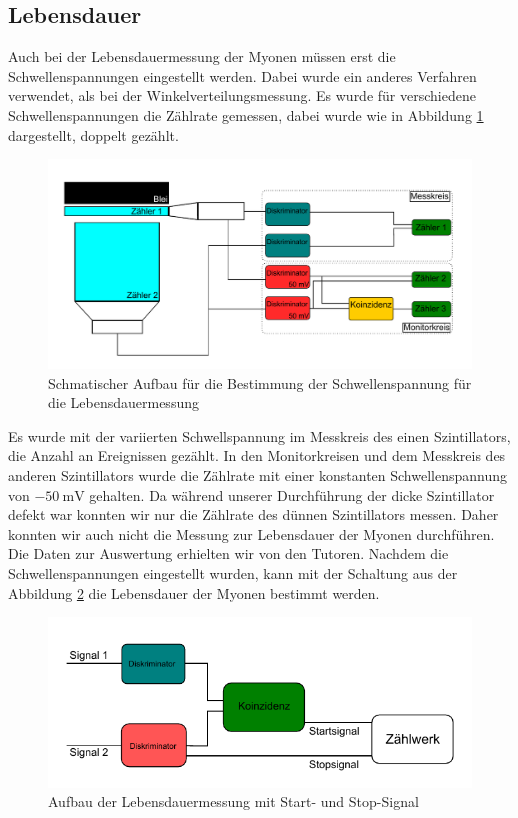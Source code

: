 \documentclass{article}
\begin{document}
\subsection{Lebensdauer}
Auch bei der Lebensdauermessung der Myonen müssen erst die Schwellenspannungen eingestellt werden.
Dabei wurde ein anderes Verfahren verwendet, als bei der Winkelverteilungsmessung.
Es wurde für verschiedene Schwellenspannungen die Zählrate gemessen, dabei wurde wie in Abbildung \ref{fig:AufbauLebensdauer} dargestellt, doppelt gezählt.
\begin{figure}[H]
    \centering
    \includegraphics[width=1\textwidth]{figures/Aufbau_Lebensdauermessung.pdf}
    \caption{Schmatischer Aufbau für die Bestimmung der Schwellenspannung für die Lebensdauermessung}
    \label{fig:AufbauLebensdauer}
\end{figure}
Es wurde mit der variierten Schwellspannung im Messkreis des einen Szintillators, die Anzahl an Ereignissen gezählt.
In den Monitorkreisen und dem Messkreis des anderen Szintillators wurde die Zählrate mit einer konstanten Schwellenspannung von $\SI{-50}{\milli\volt}$ gehalten. 
Da während unserer Durchführung der dicke Szintillator defekt war konnten wir nur die Zählrate des dünnen Szintillators messen.
Daher konnten wir auch nicht die Messung zur Lebensdauer der Myonen durchführen. Die Daten zur Auswertung erhielten wir von den Tutoren.
Nachdem die Schwellenspannungen eingestellt wurden, kann mit der Schaltung aus der Abbildung \ref{fig:AufbauZerfall} die Lebensdauer der Myonen bestimmt werden.
\begin{figure}[H]
    \centering
    \includegraphics[width=1\textwidth]{figures/Aufbau_Zerfallsmessung.pdf}
    \caption{Aufbau der Lebensdauermessung mit Start- und Stop-Signal}
    \label{fig:AufbauZerfall} 
\end{figure}
\end{document}
